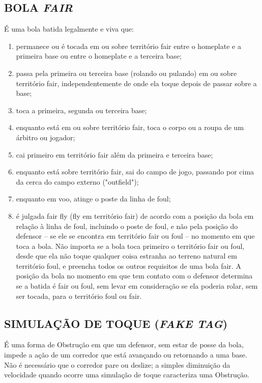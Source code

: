 \subsection{BOLA \textit{FAIR}}
 É uma bola batida legalmente e viva que:
\begin{enumerate}[label=(\alph*)]\item   permanece ou é tocada em ou sobre território \gls{fair} entre o \gls{homeplate} e a
 primeira base ou entre o \gls{homeplate} e a terceira base;
\item  passa pela primeira ou terceira base (rolando ou pulando) em ou sobre território \gls{fair}, independentemente de onde ela toque depois de passar sobre a  base;
\item  toca a primeira, segunda ou terceira base;
\item  enquanto está em ou sobre território \gls{fair}, toca o corpo ou a roupa de  um árbitro ou jogador;
\item  cai primeiro em território \gls{fair} além da primeira e terceira base;
\item  enquanto está sobre território \gls{fair}, sai do campo de jogo, passando por cima  da cerca do campo externo ("outfield");
\item   enquanto em voo, atinge o poste da linha de \gls{foul};
\item   é julgada \gls{fair fly} (\gls{fly} em território \gls{fair}) de acordo com a posição da bola em relação à linha de \gls{foul}, incluindo o poste de \gls{foul}, e não pela posição do defensor -- se ele se encontra em território \gls{fair} ou \gls{foul} -- no momento em que toca a bola. Não importa se a bola toca primeiro o território \gls{fair} ou \gls{foul}, desde que ela não toque qualquer coisa estranha ao terreno natural em território \gls{foul},
 e preencha todos os outros requisitos de uma bola \gls{fair}. A posição da bola no momento em que tem contato com o defensor determina se a batida é \gls{fair} ou
 \gls{foul}, sem levar em consideração se ela poderia rolar, sem ser tocada, para o território \gls{foul} ou \gls{fair}.
\end{enumerate}
 \subsection{SIMULAÇÃO DE TOQUE (\textit{FAKE TAG})}
 É uma forma de Obstrução em que um defensor, sem estar de posse da bola, impede a ação de um corredor que está avançando ou retornando a uma
 base. Não é necessário que o corredor pare ou deslize; a simples diminuição da velocidade quando ocorre uma simulação de toque caracteriza uma  Obstrução.

